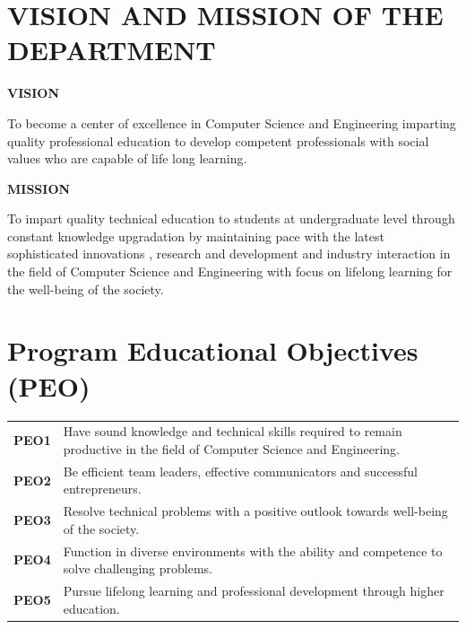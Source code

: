 \documentclass[twoside,a4paper,openright]{report} %
\begin{document}
	
	
	
	
	
	
	\thispagestyle{empty}
		\newpage
		\vspace*{6cm}
	\section*{\centering \large VISION AND MISSION OF THE DEPARTMENT} %
	\begin{center}
	\textbf{VISION}\\
	\end{center}
	To become a center of excellence in Computer Science and Engineering imparting quality professional education to develop competent professionals with social values who are capable of life long learning.
	\begin{center}
	\textbf{MISSION}\\
	\end{center}
	To impart quality technical education to students at undergraduate level through constant knowledge upgradation by maintaining pace with the latest sophisticated innovations , research and development and industry interaction in the field of Computer Science and Engineering with focus on lifelong learning for the well-being of the society.
	
	
	
	
	
	\thispagestyle{empty}
		\newpage
			\vspace*{6cm}
	\section*{\centering \large Program Educational Objectives (PEO)}
	\begin{table}[ht]
		\centering
		\begin{tabular}{p{2cm} p{12cm}}
			\textbf{PEO1}\;& Have sound knowledge and technical skills required to remain productive in the field of Computer Science and Engineering. \\
			\textbf {PEO2} \;&  Be efficient team leaders, effective communicators and successful entrepreneurs.  \\
			\textbf {PEO3}\; & Resolve technical problems with a positive outlook towards well-being of the society. \\
			\textbf {PEO4}\; & Function in diverse environments with the ability and competence to solve challenging problems. \\
			\textbf {PEO5}\; & Pursue lifelong learning and professional development through higher education. \\
		\end{tabular}
		\label{tab:my_label}
	\end{table}
	
\end{document}
